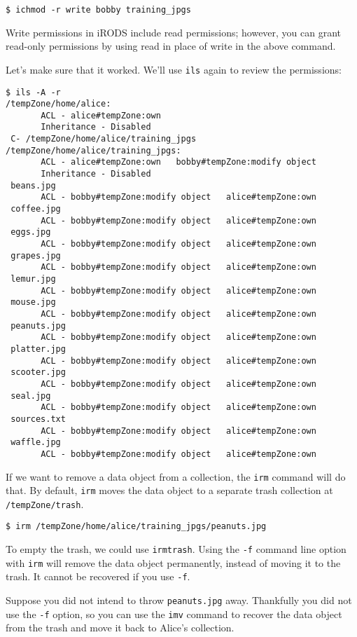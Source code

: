 \documentclass[10pt,oneside]{memoir}
\begin{document}
\begin{lstlisting}
$ ichmod -r write bobby training_jpgs
\end{lstlisting}

Write permissions in iRODS include read permissions; however, you can grant read-only permissions by using read in place of write in the above command.

Let's make sure that it worked. We'll use \texttt{ils} again to review the permissions:

\begin{lstlisting}[basicstyle=\tiny\ttfamily]
$ ils -A -r
/tempZone/home/alice:
       ACL - alice#tempZone:own
       Inheritance - Disabled
 C- /tempZone/home/alice/training_jpgs
/tempZone/home/alice/training_jpgs:
       ACL - alice#tempZone:own   bobby#tempZone:modify object
       Inheritance - Disabled
 beans.jpg
       ACL - bobby#tempZone:modify object   alice#tempZone:own
 coffee.jpg
       ACL - bobby#tempZone:modify object   alice#tempZone:own
 eggs.jpg
       ACL - bobby#tempZone:modify object   alice#tempZone:own
 grapes.jpg
       ACL - bobby#tempZone:modify object   alice#tempZone:own
 lemur.jpg
       ACL - bobby#tempZone:modify object   alice#tempZone:own
 mouse.jpg
       ACL - bobby#tempZone:modify object   alice#tempZone:own
 peanuts.jpg
       ACL - bobby#tempZone:modify object   alice#tempZone:own
 platter.jpg
       ACL - bobby#tempZone:modify object   alice#tempZone:own
 scooter.jpg
       ACL - bobby#tempZone:modify object   alice#tempZone:own
 seal.jpg
       ACL - bobby#tempZone:modify object   alice#tempZone:own
 sources.txt
       ACL - bobby#tempZone:modify object   alice#tempZone:own
 waffle.jpg
       ACL - bobby#tempZone:modify object   alice#tempZone:own
\end{lstlisting}

If we want to remove a data object from a collection, the \texttt{irm} command will do that. By default, \texttt{irm} moves the data object to a separate trash collection at \texttt{/tempZone/trash}.

\begin{lstlisting}
$ irm /tempZone/home/alice/training_jpgs/peanuts.jpg
\end{lstlisting}

To empty the trash, we could use \texttt{irmtrash}. Using the \texttt{-f} command line option with \texttt{irm} will remove the data object permanently, instead of moving it to the trash. It cannot be recovered if you use \texttt{-f}.

Suppose you did not intend to throw \texttt{peanuts.jpg} away. Thankfully you did not use the
\texttt{-f} option, so you can use the \texttt{imv} command to recover the data object from the trash and move it back to Alice's collection.
\end{document}
